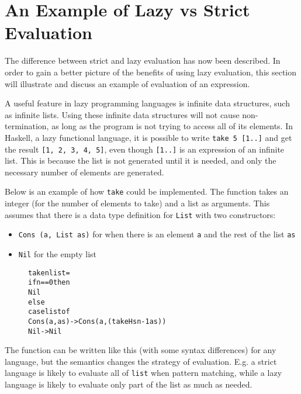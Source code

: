 \section{An Example of Lazy vs Strict Evaluation}
\label{intro:Example}
The difference between strict and lazy evaluation has now been described.
In order to gain a better picture of the benefits of using lazy evaluation,
this section will illustrate and discuss an example of evaluation of an
expression.

A useful feature in lazy programming languages is
infinite data structures, such as infinite lists. Using
these infinite data structures will not cause non-termination, as long as the
program is not trying to access all of its elements. In Haskell, a lazy
functional language, it is possible to write \texttt{take 5 [1..]} and get the
result \texttt{[1, 2, 3, 4, 5]}, even though \texttt{[1..]} is
an expression of an infinite list. This is because the list is not generated
until it is needed, and only the necessary number of elements are generated.

Below is an example of how \texttt{take} could be implemented. The function
takes an integer (for the number of elements to take) and a list as arguments.
This assumes that there is a data type definition for \texttt{List} with two
constructors:
\begin{itemize}
  \item \texttt{Cons (a, List as)} for when there is an element \texttt{a} and the rest of the list \texttt{as}
  \item \texttt{Nil} for the empty list
\end{itemize}

\begin{figure}[H]
\begin{alltt}
take n list =
  if n == 0 then
    Nil
  else
    case list of
      Cons (a, as) -> Cons (a, (takeHs n-1 as))
      Nil          -> Nil
\end{alltt}
\end{figure}

\noindent The function can be written like this (with some syntax differences)
for any language, but the semantics
changes the strategy of evaluation. E.g. a strict language is likely to evaluate
all of \texttt{list} when pattern matching, while a lazy language is likely to
evaluate only part of the list as much as needed. 

